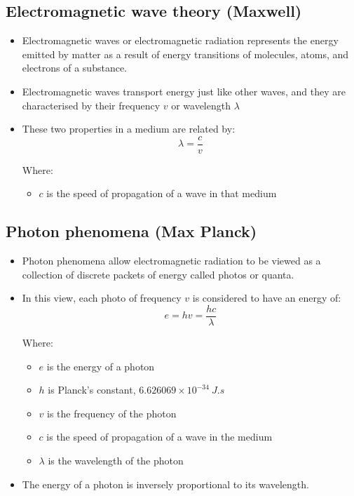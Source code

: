 \documentclass[11pt]{article}
\begin{document}
\subsection{Electromagnetic wave theory (Maxwell)}
\label{sec:org27c8b4b}
\begin{itemize}
\item Electromagnetic waves or electromagnetic radiation represents the energy emitted by matter as a result of energy transitions of molecules, atoms, and electrons of a substance.
\item Electromagnetic waves transport energy just like other waves, and they are characterised by their frequency \(v\) or wavelength \(\lambda\)
\item These two properties in a medium are related by:
\[\lambda = \frac{c}{v}\]

Where:
\begin{itemize}
\item \(c\) is the speed of propagation of a wave in that medium
\end{itemize}
\end{itemize}
\subsection{Photon phenomena (Max Planck)}
\label{sec:org1783924}
\begin{itemize}
\item Photon phenomena allow electromagnetic radiation to be viewed as a collection of discrete packets of energy called photos or quanta.
\item In this view, each photo of frequency \(v\) is considered to have an energy of:
\[e = hv = \frac{hc}{\lambda}\]

Where:
\begin{itemize}
\item \(e\) is the energy of a photon
\item \(h\) is Planck's constant, \(6.626069 \times 10^{-34} \ \unit{J.s}\)
\item \(v\) is the frequency of the photon
\item \(c\) is the speed of propagation of a wave in the medium
\item \(\lambda\) is the wavelength of the photon
\end{itemize}

\item The energy of a photon is inversely proportional to its wavelength.
\end{itemize}
\end{document}
